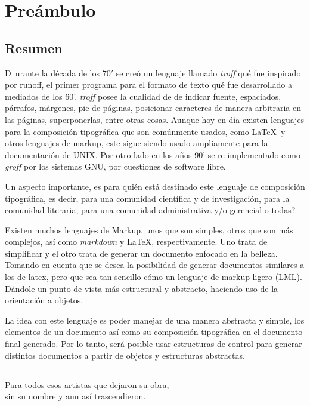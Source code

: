 \documentclass[12pt,letterpaper,titlepage,oneside,openright]{book}
\newcommand{\nonumberchapter}[1]{
    \chapter*{#1}
    \addcontentsline{toc}{chapter}{#1}
}
\begin{document}
\nonumberchapter{Preámbulo}

\section*{Resumen}

\lettrine[lines=2]{D}{}\ urante la década de los $70'$ se creó un lenguaje llamado \textit{troff} qué fue inspirado por
runoff, el primer programa para el formato de texto qué fue desarrollado a mediados
de los 60'. \textit{troff} posee la cualidad de de indicar fuente, espaciados,
párrafos, márgenes, pie de páginas, posicionar caracteres de manera arbitraria en las
páginas, superponerlas, entre otras cosas. Aunque hoy en día existen lenguajes para
la composición tipográfica que son comúnmente usados, como \LaTeX \ y otros lenguajes de
markup, este sigue siendo usado ampliamente para la documentación de UNIX. Por otro
lado en los años 90' se re-implementado como \textit{groff} por los sistemas GNU, por
cuestiones de software libre. 

Un aspecto importante, es para quién está destinado este lenguaje de composición
tipográfica, es decir, para una comunidad científica y de investigación, para la
comunidad literaria, para una comunidad administrativa y/o gerencial o todas? 

Existen muchos lenguajes de Markup, unos que son simples, otros que son más
complejos, así como \textit{markdown} y \LaTeX, respectivamente. Uno trata de
simplificar y el otro trata de generar un documento enfocado en la belleza. Tomando
en cuenta que se desea la posibilidad de generar documentos similares a los de latex,
pero que sea tan sencillo cómo un lenguaje de markup ligero (LML). Dándole un punto
de vista más estructural y abstracto, haciendo uso de la orientación a objetos.

La idea con este lenguaje es poder manejar de una manera abstracta y simple, los
elementos de un documento así como su composición tipográfica en el documento final
generado. Por lo tanto, será posible usar estructuras de control para generar
distintos documentos a partir de objetos y estructuras abstractas.


\newpage
 
\section*{} %
\begin{flushright}
Para todos esos artistas que dejaron su obra, \\ sin su nombre y aun así trascendieron.
\end{flushright}
\end{document}
